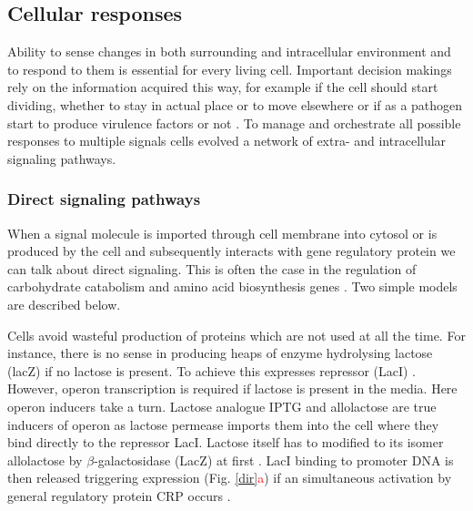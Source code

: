 \subsection{Cellular responses}
Ability to sense changes in both surrounding and intracellular environment and to respond to them is essential for every living cell.
Important decision makings rely on the information acquired this way, for example if the cell should start dividing, whether to stay in actual place or to move elsewhere or if as a pathogen start to produce virulence factors or not \cite{gottesman2003proteolysis, sourjik2012responding, cui2018novel}.
To manage and orchestrate all possible responses to multiple signals cells evolved a network of extra- and intracellular signaling pathways.

\subsubsection{Direct signaling pathways}
When a signal molecule is imported through cell membrane into cytosol or is produced by the cell and subsequently interacts with gene regulatory protein we can talk about direct signaling.
This is often the case in the regulation of carbohydrate catabolism and amino acid biosynthesis genes \cite{charlier1992arginine, weickert1992isorepressor, pittard1996various, wheatley2013structural}.
Two simple models are described below.

Cells avoid wasteful production of proteins which are not used at all the time.
For instance, there is no sense in producing heaps of enzyme hydrolysing lactose (lacZ) if no lactose is present.
To achieve this  expresses  repressor (LacI) \cite{hudson1990co}.
However,  operon transcription is required if lactose is present in the media.
Here  operon inducers take a turn.
Lactose analogue IPTG and allolactose are true inducers of  operon as lactose permease imports them into the cell where they bind directly to the repressor LacI.
Lactose itself has to modified to its isomer allolactose by $\beta$-galactosidase (LacZ) at first \cite{jobe1972lac, wheatley2013structural}.
LacI binding to promoter DNA is then released triggering  expression (Fig. \ref{dir}\textcolor{red}{a}) if an simultaneous activation by general regulatory protein CRP occurs \cite{hudson1990co, clark2005molecular}.

